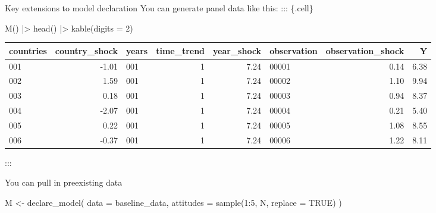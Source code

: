 \documentclass[
  11pt,
  ignorenonframetext,
]{beamer}
\newenvironment{Shaded}{\begin{snugshade}}{\end{snugshade}}
\newcommand{\AttributeTok}[1]{\textcolor[rgb]{0.40,0.45,0.13}{#1}}
\newcommand{\ConstantTok}[1]{\textcolor[rgb]{0.56,0.35,0.01}{#1}}
\newcommand{\DecValTok}[1]{\textcolor[rgb]{0.68,0.00,0.00}{#1}}
\newcommand{\FunctionTok}[1]{\textcolor[rgb]{0.28,0.35,0.67}{#1}}
\newcommand{\NormalTok}[1]{\textcolor[rgb]{0.00,0.23,0.31}{#1}}
\newcommand{\OtherTok}[1]{\textcolor[rgb]{0.00,0.23,0.31}{#1}}
\newcommand{\SpecialCharTok}[1]{\textcolor[rgb]{0.37,0.37,0.37}{#1}}
\begin{document}
\begin{frame}[fragile]{Key extensions to model declaration}
\protect\hypertarget{key-extensions-to-model-declaration-3}{}
You can generate panel data like this: ::: \{.cell\}

\begin{Shaded}
\begin{Highlighting}[]
\FunctionTok{M}\NormalTok{() }\SpecialCharTok{|\textgreater{}} \FunctionTok{head}\NormalTok{() }\SpecialCharTok{|\textgreater{}} \FunctionTok{kable}\NormalTok{(}\AttributeTok{digits =} \DecValTok{2}\NormalTok{)}
\end{Highlighting}
\end{Shaded}

\begin{tabular}{l|r|l|r|r|l|r|r}
\hline
countries & country\_shock & years & time\_trend & year\_shock & observation & observation\_shock & Y\\
\hline
001 & -1.01 & 001 & 1 & 7.24 & 00001 & 0.14 & 6.38\\
\hline
002 & 1.59 & 001 & 1 & 7.24 & 00002 & 1.10 & 9.94\\
\hline
003 & 0.18 & 001 & 1 & 7.24 & 00003 & 0.94 & 8.37\\
\hline
004 & -2.07 & 001 & 1 & 7.24 & 00004 & 0.21 & 5.40\\
\hline
005 & 0.22 & 001 & 1 & 7.24 & 00005 & 1.08 & 8.55\\
\hline
006 & -0.37 & 001 & 1 & 7.24 & 00006 & 1.22 & 8.11\\
\hline
\end{tabular}

:::
\end{frame}

\begin{frame}[fragile]{You can pull in preexisting data}
\protect\hypertarget{you-can-pull-in-preexisting-data}{}
\begin{Shaded}
\begin{Highlighting}[]
\NormalTok{M }\OtherTok{\textless{}{-}} 
  \FunctionTok{declare\_model}\NormalTok{(}
    \AttributeTok{data =}\NormalTok{ baseline\_data,}
    \AttributeTok{attitudes =} \FunctionTok{sample}\NormalTok{(}\DecValTok{1}\SpecialCharTok{:}\DecValTok{5}\NormalTok{, N, }\AttributeTok{replace =} \ConstantTok{TRUE}\NormalTok{)}
\NormalTok{  )}
\end{Highlighting}
\end{Shaded}
\end{frame}
\end{document}
